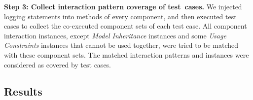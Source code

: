 \textbf{Step 3: Collect interaction pattern coverage of test~cases.} We injected logging statements into methods of every component, and then executed test cases to collect the co-executed component sets of each test case. 
All component interaction instances, except \textit{Model Inheritance} instances and some \textit{Usage Constraints} instances that cannot be used together, were tried to be matched with these component sets. 
The matched interaction patterns and instances were considered as covered by test cases.

\subsection{Results}


